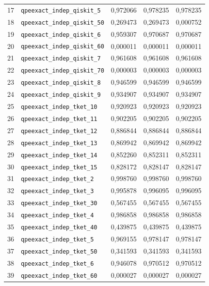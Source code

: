 \documentclass[a4paper,10pt]{article}
\begin{document}
\begin{longtable}{r p{8.2cm} r r r}
17 & \nolinkurl{qpeexact_indep_qiskit_5} & 0,972066 & 0,978235 & 0,978235\\ 
18 & \nolinkurl{qpeexact_indep_qiskit_50} & 0,269473 & 0,269473 & 0,000752\\ 
19 & \nolinkurl{qpeexact_indep_qiskit_6} & 0,959307 & 0,970687 & 0,970687\\ 
20 & \nolinkurl{qpeexact_indep_qiskit_60} & 0,000011 & 0,000011 & 0,000011\\ 
21 & \nolinkurl{qpeexact_indep_qiskit_7} & 0,961608 & 0,961608 & 0,961608\\ 
22 & \nolinkurl{qpeexact_indep_qiskit_70} & 0,000003 & 0,000003 & 0,000003\\ 
23 & \nolinkurl{qpeexact_indep_qiskit_8} & 0,946599 & 0,946599 & 0,946599\\ 
24 & \nolinkurl{qpeexact_indep_qiskit_9} & 0,934907 & 0,934907 & 0,934907\\ 
25 & \nolinkurl{qpeexact_indep_tket_10} & 0,920923 & 0,920923 & 0,920923\\ 
26 & \nolinkurl{qpeexact_indep_tket_11} & 0,902205 & 0,902205 & 0,902205\\ 
27 & \nolinkurl{qpeexact_indep_tket_12} & 0,886844 & 0,886844 & 0,886844\\ 
28 & \nolinkurl{qpeexact_indep_tket_13} & 0,869942 & 0,869942 & 0,869942\\ 
29 & \nolinkurl{qpeexact_indep_tket_14} & 0,852260 & 0,852311 & 0,852311\\ 
30 & \nolinkurl{qpeexact_indep_tket_15} & 0,828172 & 0,828147 & 0,828147\\ 
31 & \nolinkurl{qpeexact_indep_tket_2} & 0,998760 & 0,998760 & 0,998760\\ 
32 & \nolinkurl{qpeexact_indep_tket_3} & 0,995878 & 0,996095 & 0,996095\\ 
33 & \nolinkurl{qpeexact_indep_tket_30} & 0,567455 & 0,567455 & 0,567455\\ 
34 & \nolinkurl{qpeexact_indep_tket_4} & 0,986858 & 0,986858 & 0,986858\\ 
35 & \nolinkurl{qpeexact_indep_tket_40} & 0,439875 & 0,439875 & 0,439875\\ 
36 & \nolinkurl{qpeexact_indep_tket_5} & 0,969155 & 0,978147 & 0,978147\\ 
37 & \nolinkurl{qpeexact_indep_tket_50} & 0,341593 & 0,341593 & 0,341593\\ 
38 & \nolinkurl{qpeexact_indep_tket_6} & 0,946078 & 0,970512 & 0,970512\\ 
39 & \nolinkurl{qpeexact_indep_tket_60} & 0,000027 & 0,000027 & 0,000027\\ 

\end{longtable}
\end{document}

